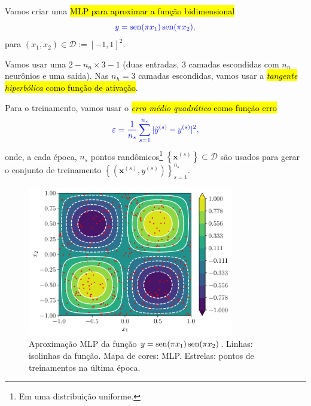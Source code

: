 Vamos criar uma \hl{MLP para aproximar a função bidimensional}
\begin{equation}\color{blue}y = \operatorname{sen}(\pi x_1)\operatorname{sen}(\pi x_2),
\end{equation}
para $(x_1, x_2) \in \mathcal{D} := [-1, 1]^2$.

Vamos usar uma  $2 - n_n\times 3 - 1$ (duas entradas, 3 camadas escondidas com $n_n$ neurônios e uma saída). Nas $n_h=3$ camadas escondidas, vamos usar a \hl{\emph{tangente hiperbólica} como função de ativação}.

Para o treinamento, vamos usar o \hl{\emph{erro médio quadrático} como função erro}
\begin{equation}\color{blue}\varepsilon = \frac{1}{n_s}\sum_{s=1}^{n_s}|\tilde{y}^{(s)} - y^{(s)}|^2,
\end{equation}
onde, a cada época, $n_s$ pontos randômicos\footnote{Em uma distribuição uniforme.} $\left\{\pmb{x}^{(s)}\right\}\subset \mathcal{D}$ são usados para gerar o conjunto de treinamento $\left\{\left(\pmb{x}^{(s)}, y^{(s)}\right)\right\}_{s=1}^{n_s}$. 

\begin{figure}[H]
  \centering
  \includegraphics[width=0.8\textwidth]{cap_mlp/dados/py_mlp_apfun_2d/fig}
  \caption{Aproximação MLP da função $y = \operatorname{sen}(\pi x_1)\operatorname{sen}(\pi x_2)$. Linhas: isolinhas da função. Mapa de cores: MLP. Estrelas: pontos de treinamentos na última época.}
  \label{fig:mlp_apfun_2d}
\end{figure}

